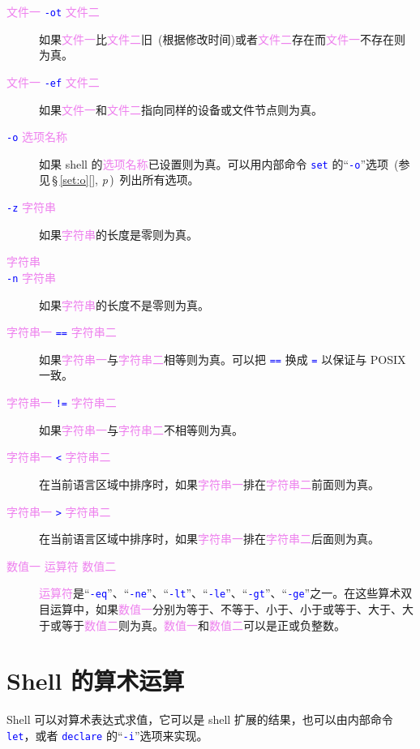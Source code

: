 \documentclass[openany,notitlepage]{book}
\newcommand{\code}[1]{\textcolor{blue}{{\tt #1}}}
\newcommand{\hs}[1]{{\textcolor{violet}{#1}}}
\newcommand{\fullref}[1]{\,\S\,\ref{#1}[\nameref{#1}], \textit{p\pageref{#1}}\,}
\begin{document}
\begin{CJK}{UTF8}{song}
\begin{description}
    \item[\hs{文件一} \code{-ot} \hs{文件二}] 如果\hs{文件一}比\hs{文件二}旧~(根据修改时间)或者\hs{文件二}存在而\hs{文件一}不存在则为真。
    \item[\hs{文件一} \code{-ef} \hs{文件二}] 如果\hs{文件一}和\hs{文件二}指向同样的设备或文件节点则为真。
    \item[\code{-o} \hs{选项名称}] 如果 shell 的\hs{选项名称}已设置则为真。可以用内部命令 \code{set} 的``\code{-o}''选项~(参见\fullref{set:o})~列出所有选项。
    \item[\code{-z} \hs{字符串}] 如果\hs{字符串}的长度是零则为真。
    \item[\hs{字符串}]
    \item[\code{-n} \hs{字符串}] 如果\hs{字符串}的长度不是零则为真。
    \item[\hs{字符串一} \code{==} \hs{字符串二}] 如果\hs{字符串一}与\hs{字符串二}相等则为真。可以把 \code{==} 换成 \code{=} 以保证与 POSIX 一致。
    \item[\hs{字符串一} \code{!=} \hs{字符串二}] 如果\hs{字符串一}与\hs{字符串二}不相等则为真。
    \item[\hs{字符串一} \code{<} \hs{字符串二}] 在当前语言区域中排序时，如果\hs{字符串一}排在\hs{字符串二}前面则为真。
    \item[\hs{字符串一} \code{>} \hs{字符串二}] 在当前语言区域中排序时，如果\hs{字符串一}排在\hs{字符串二}后面则为真。
    \item[\hs{数值一} \hs{运算符} \hs{数值二}] \hs{运算符}是``\code{-eq}''、``\code{-ne}''、``\code{-lt}''、``\code{-le}''、``\code{-gt}''、``\code{-ge}''之一。在这些算术双目运算中，如果\hs{数值一}分别为等于、不等于、小于、小于或等于、大于、大于或等于\hs{数值二}则为真。\hs{数值一}和\hs{数值二}可以是正或负整数。
\end{description}

\section{Shell 的算术运算}\label{shell-arithmetic} %
Shell 可以对算术表达式求值，它可以是 shell 扩展的结果，也可以由内部命令 \code{let}，或者 \code{declare} 的``\code{-i}''选项来实现。


\end{CJK}
\end{document}
